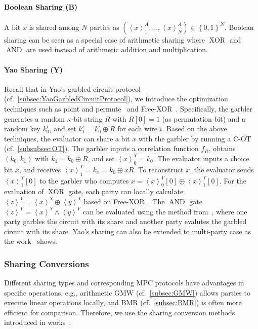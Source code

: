 \paragraph{Boolean Sharing (B)}
\label{para:BooleanSharing}
A bit $x$ is shared among $N$ parties as $\left(\left\langle x\right\rangle ^A_1, \ldots,\left\langle x\right\rangle ^A_N \right) \in \left\{0,1\right\}^N$. Boolean sharing can be seen as a special case of arithmetic sharing where $\operatorname{XOR}$ and $\operatorname{AND}$ are used instead of arithmetic addition and multiplication.


\paragraph{Yao Sharing (Y)}
\label{para:YaoSharing}
Recall that in Yao's garbled circuit protocol (cf.~\autoref{subsec:YaoGarbledCircuitProtocol}), we introduce the optimization techniques such as point and permute~\cite{beaver1990round} and Free-XOR~\cite{kolesnikov2008improved}. Specifically, the garbler generates a random $\kappa$-bit string $R$ with $R\left[0\right] =1$ (as permutation bit) and a random key $k_0^i$, and set $k_1^i=k_0^i\oplus R$ for each wire $i$.
Based on the above techniques, the evaluator can share a bit $x$ with the garbler by running a C-OT (cf.~\autoref{subsubsec:OT}). The garbler inputs a correlation function $f_{R }$, obtains $\left(k_0,k_1 \right) $ with $k_1=k_0\oplus R$, and set $\left\langle x\right\rangle^Y_0 =k_0$. The evaluator inputs a choice bit $x$, and receives $\left\langle x\right\rangle^Y_1 =k_x=k_0\oplus x R$. To reconstruct $x$, the evaluator sends $\left\langle x\right\rangle^Y_1\left[0\right] $ to the garbler who computes $x=\left\langle x\right\rangle^Y_0\left[0\right]\oplus \left\langle x\right\rangle^Y_1\left[0\right]$.
For the evaluation of $\operatorname{XOR}$ gate, each party can locally calculate $\left\langle z\right\rangle ^Y=\left\langle x\right\rangle^Y\oplus \left\langle y\right\rangle ^Y $ based on Free-XOR~\cite{kolesnikov2008improved}. The $\operatorname{AND}$ gate $\left\langle z\right\rangle ^Y=\left\langle x\right\rangle^Y \land\left\langle y\right\rangle ^Y $ can be evaluated using the method from~\cite{bellare2013efficient}, where one party garbles the circuit with its share and another party evalutes the garbled circuit with its share.
Yao's sharing can also be extended to multi-party case as the work~\cite{Braun} shows.

\subsubsection{Sharing Conversions}
\label{subsubsec:SharingConversions}
Different sharing types and corresponding MPC protocols have advantages in specific operations, e.g., arithmetic GMW (cf.~\autoref{subsec:GMW}) allows parties to execute linear operations locally, and BMR (cf.~\autoref{subsec:BMR}) is often more efficient for comparison. Therefore, we use the sharing conversion methods introduced in works~\cite{DSZ15,braun2020motion}.

